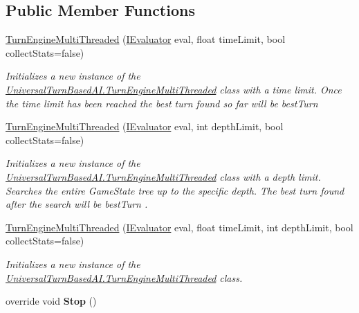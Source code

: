 \subsection*{Public Member Functions}
\begin{DoxyCompactItemize}
\item 
\hyperlink{class_universal_turn_based_a_i_1_1_turn_engine_multi_threaded_a7159b2c6a0ffb898dc61ca2646399d4b}{Turn\+Engine\+Multi\+Threaded} (\hyperlink{interface_universal_turn_based_a_i_1_1_i_evaluator}{I\+Evaluator} eval, float time\+Limit, bool collect\+Stats=false)
\begin{DoxyCompactList}\small\item\em Initializes a new instance of the \hyperlink{class_universal_turn_based_a_i_1_1_turn_engine_multi_threaded}{Universal\+Turn\+Based\+A\+I.\+Turn\+Engine\+Multi\+Threaded} class with a time limit. Once the time limit has been reached the best turn found so far will be {\itshape best\+Turn}  \end{DoxyCompactList}\item 
\hyperlink{class_universal_turn_based_a_i_1_1_turn_engine_multi_threaded_a2c0825b1812b2c1b0065c1bf977423c4}{Turn\+Engine\+Multi\+Threaded} (\hyperlink{interface_universal_turn_based_a_i_1_1_i_evaluator}{I\+Evaluator} eval, int depth\+Limit, bool collect\+Stats=false)
\begin{DoxyCompactList}\small\item\em Initializes a new instance of the \hyperlink{class_universal_turn_based_a_i_1_1_turn_engine_multi_threaded}{Universal\+Turn\+Based\+A\+I.\+Turn\+Engine\+Multi\+Threaded} class with a depth limit. Searches the entire Game\+State tree up to the specific depth. The best turn found after the search will be {\itshape best\+Turn} . \end{DoxyCompactList}\item 
\hyperlink{class_universal_turn_based_a_i_1_1_turn_engine_multi_threaded_aba842ea4a30d4c58d1bb139aff873e8a}{Turn\+Engine\+Multi\+Threaded} (\hyperlink{interface_universal_turn_based_a_i_1_1_i_evaluator}{I\+Evaluator} eval, float time\+Limit, int depth\+Limit, bool collect\+Stats=false)
\begin{DoxyCompactList}\small\item\em Initializes a new instance of the \hyperlink{class_universal_turn_based_a_i_1_1_turn_engine_multi_threaded}{Universal\+Turn\+Based\+A\+I.\+Turn\+Engine\+Multi\+Threaded} class. \end{DoxyCompactList}\item 
\hypertarget{class_universal_turn_based_a_i_1_1_turn_engine_multi_threaded_a01bed3edbbe50d06f06e68b52af13c9c}{}override void {\bfseries Stop} ()\label{class_universal_turn_based_a_i_1_1_turn_engine_multi_threaded_a01bed3edbbe50d06f06e68b52af13c9c}

\end{DoxyCompactItemize}
